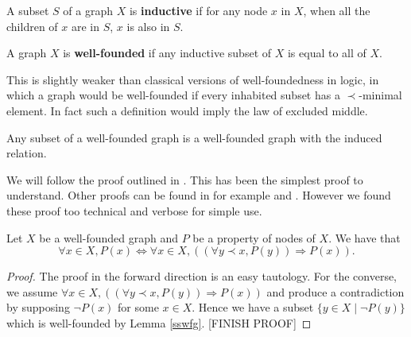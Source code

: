 \begin{defin}
    A subset $S$ of a graph $X$ is \textbf{inductive} if for any node $x$ in $X$, when all the children of $x$ are in $S$, $x$ is also in $S$.
\end{defin}

\begin{defin}
    A graph $X$ is \textbf{well-founded} if any inductive subset of $X$ is equal to all of $X$.
\end{defin}

\begin{remark}
    This is slightly weaker than classical versions of well-foundedness in logic, in which a graph would be well-founded if every inhabited subset has a $\prec$-minimal element. In fact such a definition would imply the law of excluded middle.
\end{remark}

\begin{lemma}\label{sswfg}
    Any subset of a well-founded graph is a well-founded graph with the induced relation.
\end{lemma}

We will follow the proof outlined in \cite{winskel1993formal}. This has been the simplest proof to understand. Other proofs can be found in for example \cite{johnstone1987notes} and \cite[Chapter 7]{barwise1982handbook}. However we found these proof too technical and verbose for simple use.

\begin{theorem}
    Let $X$ be a well-founded graph and $P$ be a property of nodes of $X$.
    We have that $$\forall x \in X, P(x) \Leftrightarrow \forall x \in X,((\forall y \prec x, P(y)) \Rightarrow P(x)).$$
\end{theorem}

\begin{proof}
    The proof in the forward direction is an easy tautology. For the converse, we assume  $ \forall x \in X,((\forall y \prec x, P(y)) \Rightarrow P(x))$ and produce a contradiction by supposing $\neg P(x)$ for some $x \in X$. Hence we have a subset $\{y \in X \mid \neg P(y) \} $ which is well-founded by Lemma \ref{sswfg}. [FINISH PROOF]
\end{proof}

